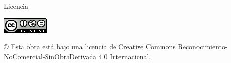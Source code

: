 \newpage
\thispagestyle{empty}

\bigskip
\begin{LARGE}
Licencia
\end{LARGE}

\bigskip

\begin{center}
 \includegraphics[scale=1.8]{images/by-nc-nd_88x31}\\[5mm]
\end{center}

 \begin{large}
 © Esta obra está bajo una licencia de Creative Commons Reconocimiento-NoComercial-SinObraDerivada 4.0 Internacional.
 \end{large}









